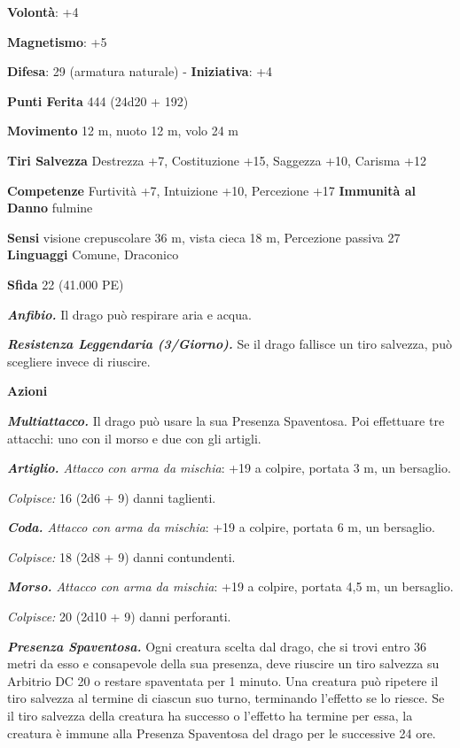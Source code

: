 \begin{multicols}{2}
\textbf{Volontà}: +4

\textbf{Magnetismo}: +5

\textbf{Difesa}: 29 (armatura naturale) - \textbf{Iniziativa}: +4

\textbf{Punti Ferita} 444 (24d20 + 192)

\textbf{Movimento} 12 m, nuoto 12 m, volo 24 m

\textbf{Tiri Salvezza} Destrezza +7, Costituzione +15, Saggezza +10,
Carisma +12

\textbf{Competenze} Furtività +7, Intuizione +10, Percezione +17
\textbf{Immunità al Danno} fulmine

\textbf{Sensi} visione crepuscolare 36 m, vista cieca 18 m, Percezione passiva
27 \textbf{Linguaggi} Comune, Draconico

\textbf{Sfida} 22 (41.000 PE)\smallskip

\emph{\textbf{Anfibio.}} Il drago può respirare aria e acqua.

\emph{\textbf{Resistenza Leggendaria (3/Giorno).}} Se il drago fallisce
un tiro salvezza, può scegliere invece di riuscire.

\smallskip\textbf{Azioni}

\emph{\textbf{Multiattacco.}} Il drago può usare la sua Presenza
Spaventosa. Poi effettuare tre attacchi: uno con il morso e due con gli
artigli.

\emph{\textbf{Artiglio.} Attacco con arma da mischia}: +19 a colpire,
portata 3 m, un bersaglio.

\emph{Colpisce:} 16 (2d6 + 9) danni taglienti.

\emph{\textbf{Coda.} Attacco con arma da mischia}: +19 a colpire,
portata 6 m, un bersaglio.

\emph{Colpisce:} 18 (2d8 + 9) danni contundenti.

\emph{\textbf{Morso.} Attacco con arma da mischia}: +19 a colpire,
portata 4,5 m, un bersaglio.

\emph{Colpisce:} 20 (2d10 + 9) danni perforanti.

\emph{\textbf{Presenza Spaventosa.}} Ogni creatura scelta dal drago, che
si trovi entro 36 metri da esso e consapevole della sua presenza, deve
riuscire un tiro salvezza su Arbitrio DC 20 o restare spaventata per 1
minuto. Una creatura può ripetere il tiro salvezza al termine di ciascun
suo turno, terminando l'effetto se lo riesce. Se il tiro salvezza della
creatura ha successo o l'effetto ha termine per essa, la creatura è
immune alla Presenza Spaventosa del drago per le successive 24 ore.


\end{multicols}
